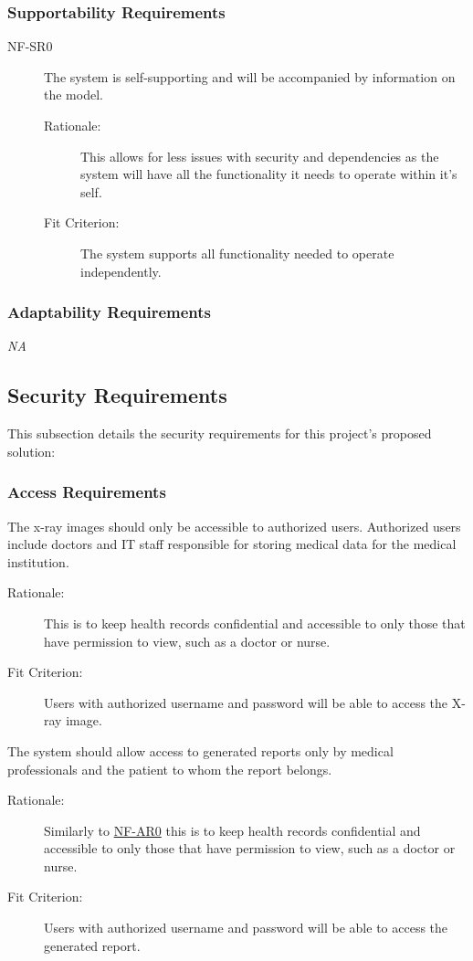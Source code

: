 \documentclass[12pt]{article}
\begin{document}
\subsubsection{Supportability Requirements}
\begin{description}
    \item[NF-SR0] The system is self-supporting and will be accompanied by information on the model. 
    \begin{description}
        \item[Rationale:] This allows for less issues with security and dependencies as the system will have all the functionality it needs to operate within it's self.
        \item[Fit Criterion:] The system supports all functionality needed to operate independently. 
    \end{description}
\end{description}

\subsubsection{Adaptability Requirements}
\textit{NA}

\subsection{Security Requirements}
This subsection details the security requirements for this project's proposed solution:

\subsubsection{Access Requirements}
\begin{description}
\hypertarget{AR0}{}
    \item[NF-AR0] The x-ray images should only be accessible to authorized users. Authorized users include doctors and IT staff responsible for storing medical data for the medical institution. 
    \begin{description}
        \item[Rationale:] This is to keep health records confidential and accessible to only those that have permission to view, such as a doctor or nurse. 
        \item[Fit Criterion:] Users with authorized username and password will be able to access the X-ray image.
    \end{description}
    \item[NF-AR1] The system should allow access to generated reports only by medical professionals and the patient to whom the report belongs. 
    \begin{description}
        \item[Rationale:] Similarly to \hyperlink{AR0}{NF-AR0} this is to keep health records confidential and accessible to only those that have permission to view, such as a doctor or nurse. 
        \item[Fit Criterion:] Users with authorized username and password will be able to access the generated report.
    \end{description}
\end{description}
\end{document}
